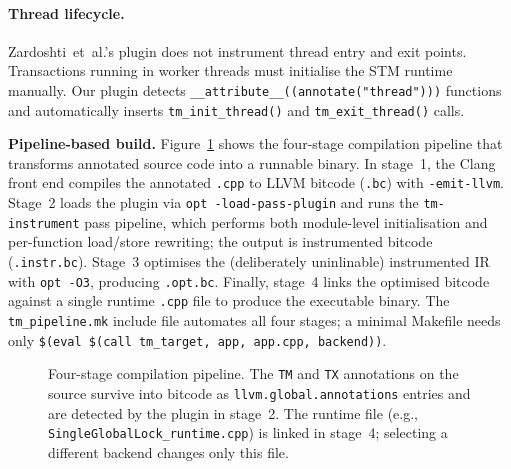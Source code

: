 \documentclass[article,12pt]{article}
\newcommand{\ZardoshtiEtAl}{Zardoshti~et~al.}
\begin{document}
\paragraph{Thread lifecycle.}  \ZardoshtiEtAl's plugin does not instrument thread entry and
exit points.  Transactions running in worker threads must initialise the STM runtime
manually.  Our plugin detects \texttt{\_\_attribute\_\_((annotate("thread")))}
functions and automatically inserts \texttt{tm\_init\_thread()} and
\texttt{tm\_exit\_thread()} calls.

\textbf{Pipeline-based build.}  Figure~\ref{fig:pipeline} shows the four-stage
compilation pipeline that transforms annotated source code into a runnable binary.
In stage~1, the Clang front end compiles the annotated \texttt{.cpp} to LLVM
bitcode (\texttt{.bc}) with \texttt{-emit-llvm}.  Stage~2 loads the plugin via
\texttt{opt -load-pass-plugin} and runs the \texttt{tm-instrument} pass pipeline,
which performs both module-level initialisation and per-function load/store
rewriting; the output is instrumented bitcode (\texttt{.instr.bc}).  Stage~3
optimises the (deliberately uninlinable) instrumented IR with \texttt{opt -O3},
producing \texttt{.opt.bc}.  Finally, stage~4 links the optimised bitcode against
a single runtime \texttt{.cpp} file to produce the executable binary.  The
\texttt{tm\_pipeline.mk} include file automates all four stages; a minimal
Makefile needs only \texttt{\$(eval \$(call tm\_target, app, app.cpp, backend))}.

\begin{figure}[h]
\centering
{}
\caption{Four-stage compilation pipeline.  The \texttt{TM} and \texttt{TX}
annotations on the source survive into bitcode as
\texttt{llvm.global.annotations} entries and are detected by the plugin in
stage~2.  The runtime file (e.g., \texttt{SingleGlobalLock\_runtime.cpp}) is
linked in stage~4; selecting a different backend changes only this file.}
\label{fig:pipeline}
\end{figure}
\end{document}
